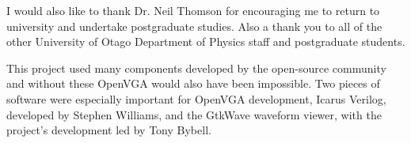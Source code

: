 \documentclass[a4paper,10pt]{report}
\begin{document}
I would also like to thank Dr. Neil Thomson for encouraging me to return to
university and undertake postgraduate studies. Also a thank you to all of the
other University of Otago Department of Physics staff and postgraduate students.

This project used many components developed by the open-source community and
without these OpenVGA would also have been impossible. Two pieces of software
were especially important for OpenVGA development, Icarus Verilog, developed by
Stephen Williams, and the GtkWave waveform viewer, with the project's development
led by Tony Bybell.



\tableofcontents
\listoftables
\listoffigures

\printglossaries
% 


\newcommand\mmodule[6] %
{
\begin{center}
\shadowbox{
\begin{tabular}{l r r r}%
\textbf{Module:}	& \multicolumn{3}{l}{\begin{minipage}[t]{0.7\linewidth}#2\end{minipage}}\\%
\textbf{Description:}	& \multicolumn{3}{l}{\begin{minipage}[t]{0.7\linewidth}\raggedright#3\end{minipage}}\\%
\textbf{Related Files:}	& \multicolumn{3}{l}{\begin{minipage}[t]{0.7\linewidth}\raggedright#4\end{minipage}}\\%
\textbf{Testing Files:}	& \multicolumn{3}{l}{\begin{minipage}[t]{0.7\linewidth}\raggedright#5\end{minipage}}\\%
\textbf{Author:}	& #1 & \multicolumn{2}{r}{\textbf{License:} #6}\\%
\end{tabular}
}
\end{center}
}

\newcommand\ldescript[3]{
\textbf{#1:} & \multicolumn{3}{l}{
		\begin{minipage}[t]{#2\linewidth}\raggedright#3\end{minipage}
    }
}

\newcommand\filedescript[6] %
{
\begin{center} \shadowbox{
	\begin{tabular}{l r r r}%
		\ldescript{File}{0.7}{#2}	\\
		\ldescript{Description}{0.7}{#3}	\\
		\ldescript{Related Files}{0.7}{#4}	\\
		\ldescript{Testing Files}{0.7}{#5}	\\
		\textbf{Author:}	& #1 & \multicolumn{2}{r}{\textbf{License:} #6}\\
	\end{tabular}
}	\end{center}
}
\end{document}
